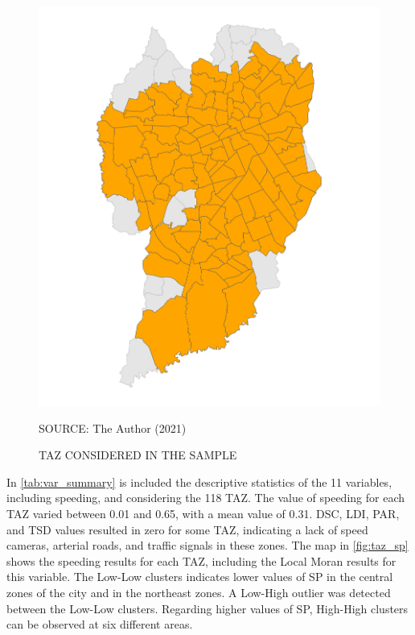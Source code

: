 \begin{figure}[!htbp]
    \centering\footnotesize
    \captionsetup{font=footnotesize}
    \caption{TAZ CONSIDERED IN THE SAMPLE}
    \includegraphics{fig/map_filter.png}
    \label{fig:taz_filter}
    \par SOURCE: The Author (2021)
\end{figure}


In \autoref{tab:var_summary} is included the descriptive statistics of the 11 variables, including speeding, and considering the 118 TAZ. The value of speeding for each TAZ varied between 0.01 and 0.65, with a mean value of 0.31.  DSC, LDI, PAR, and TSD values resulted in zero for some TAZ, indicating a lack of speed cameras, arterial roads, and traffic signals in these zones. The map in \autoref{fig:taz_sp} shows the speeding results for each TAZ, including the Local Moran results for this variable. The Low-Low clusters indicates lower values of SP in the central zones of the city and in the northeast zones. A Low-High outlier was detected between the Low-Low clusters. Regarding higher values of SP, High-High clusters can be observed at six different areas.

